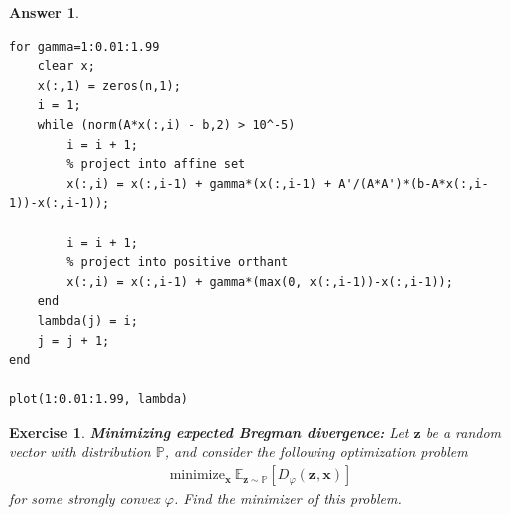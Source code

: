 \documentclass[12pt]{article}
\theoremstyle{colon}
\newtheorem{exercise}{Exercise}
\newtheorem*{answer}{Answer}
\begin{document}
\begin{answer}
\begin{enumerate}[label=\alph*)]
\begin{lstlisting}[style=Matlab-editor, basicstyle=\scriptsize]
for gamma=1:0.01:1.99
    clear x;
    x(:,1) = zeros(n,1);
    i = 1;
    while (norm(A*x(:,i) - b,2) > 10^-5)
        i = i + 1;
        % project into affine set
        x(:,i) = x(:,i-1) + gamma*(x(:,i-1) + A'/(A*A')*(b-A*x(:,i-1))-x(:,i-1));

        i = i + 1;
        % project into positive orthant
        x(:,i) = x(:,i-1) + gamma*(max(0, x(:,i-1))-x(:,i-1));
    end
    lambda(j) = i;
    j = j + 1;
end

plot(1:0.01:1.99, lambda)
			\end{lstlisting}
	\end{enumerate}

\end{answer}

\clearpage

\begin{exercise}
	\textbf{Minimizing expected Bregman divergence:} Let $\bm{z}$ be a random vector with distribution $\mathbb{P}$, and consider the following optimization problem
	\begin{gather*}
		\text{minimize}_{\bm{x}} \ \mathbb{E}_{\bm{z} \sim \mathbb{P}} [ D_{\varphi} (\bm{z}, \bm{x}) ]
	\end{gather*}
	for some strongly convex $\varphi$. Find the minimizer of this problem.
\end{exercise}
\end{document}
